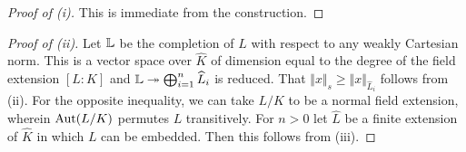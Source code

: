 \begin{proof}[Proof of (i)]
    This is immediate from the construction. 
\end{proof}
\begin{proof}[Proof of (ii)]
    Let $\mathbb{L}$ be the completion of $L$ with respect to any weakly Cartesian norm. This is a vector space over $\widehat{K}$ of dimension equal to the degree of the field extension $[L:K]$ and $\mathbb{L}\twoheadrightarrow\bigoplus_{i=1}^{n}\widehat{L}_{i}$ is reduced. That $\Vert x\Vert_{s}\geq\Vert x\Vert_{\widehat{L}_{i}}$ follows from  (ii). For the opposite inequality, we can take $L/K$ to be a normal field extension, wherein $\mathrm{Aut}(L/K)$ permutes $L$ transitively. For $n>0$ let $\widehat{L}$ be a finite extension of $\widehat{K}$ in which $L$ can be embedded. Then this follows from  (iii). 
\end{proof}